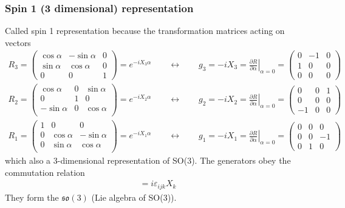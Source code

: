 \documentclass[../main.tex]{subfiles}
\begin{document}
\begin{itemize}
\subsubsection{Spin 1 (3 dimensional) representation}
Called spin 1 representation because the transformation matrices acting on vectors 
\begin{align}
R_3=\left(\begin{matrix}
\cos\alpha  & -\sin\alpha & 0\\
\sin\alpha & \cos\alpha & 0\\
0 & 0 & 1 
\end{matrix}\right)=e^{-iX_3\alpha}
\qquad\leftrightarrow\qquad
g_3=-iX_3=\left.\frac{\partial R}{\partial\alpha}\right|_{\alpha=0}=\left(\begin{matrix}
0 & -1 & 0\\
1 & 0  & 0\\
0 & 0  & 0
\end{matrix}\right)\\
R_2=\left(\begin{matrix}
\cos\alpha  & 0 & \sin\alpha\\
0 & 1 & 0\\
-\sin\alpha & 0 & \cos\alpha\\
\end{matrix}\right)=e^{-iX_2\alpha}
\qquad\leftrightarrow\qquad
g_2=-iX_2=\left.\frac{\partial R}{\partial\alpha}\right|_{\alpha=0}=\left(\begin{matrix}
0 & 0  & 1\\
0 & 0  & 0\\
-1 & 0  & 0
\end{matrix}\right)\\
R_1=\left(\begin{matrix}
1 & 0 & 0 \\
0 & \cos\alpha & -\sin\alpha\\
0 & \sin\alpha &  \cos\alpha\\
\end{matrix}\right)=e^{-iX_1\alpha}
\qquad\leftrightarrow\qquad
g_1=-iX_1=\left.\frac{\partial R}{\partial\alpha}\right|_{\alpha=0}=\left(\begin{matrix}
0 & 0  & 0\\
0 & 0  & -1\\
0 & 1  & 0
\end{matrix}\right)
\end{align}  
which also a 3-dimensional representation of SO(3). The generators obey the commutation relation 
\begin{align}
[X_i,X_i]=i\varepsilon_{ijk}X_k
\end{align}
They form the $\mathfrak{so}(3)$ (Lie algebra of SO(3)).


\end{itemize}
\end{document}

